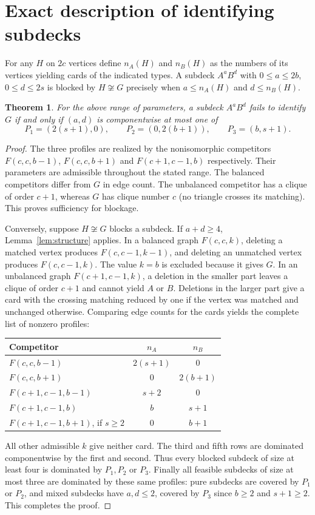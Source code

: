 \documentclass[11pt]{article}
\newtheorem{theorem}{Theorem}
\begin{document}
\section{Exact description of identifying subdecks}
For any $H$ on $2c$ vertices define $n_A(H)$ and $n_B(H)$ as the numbers of its vertices yielding cards of the indicated types. A subdeck $A^aB^d$ with $0\leq a\leq2b$, $0\leq d\leq2s$ is blocked by $H\not\cong G$ precisely when $a\leq n_A(H)$ and $d\leq n_B(H)$.
\begin{theorem}\label{thm:profiles}
For the above range of parameters, a subdeck $A^aB^d$ fails to identify $G$ if and only if $(a,d)$ is componentwise at most one of
\[
 P_1=(2(s+1),0),\qquad P_2=(0,2(b+1)),\qquad P_3=(b,s+1).
\]
\end{theorem}
\begin{proof}
The three profiles are realized by the nonisomorphic competitors $F(c,c,b-1)$, $F(c,c,b+1)$ and $F(c+1,c-1,b)$ respectively. Their parameters are admissible throughout the stated range. The balanced competitors differ from $G$ in edge count. The unbalanced competitor has a clique of order $c+1$, whereas $G$ has clique number $c$ (no triangle crosses its matching). This proves sufficiency for blockage.

Conversely, suppose $H\not\cong G$ blocks a subdeck. If $a+d\geq4$, Lemma~\ref{lem:structure} applies. In a balanced graph $F(c,c,k)$, deleting a matched vertex produces $F(c,c-1,k-1)$, and deleting an unmatched vertex produces $F(c,c-1,k)$. The value $k=b$ is excluded because it gives $G$. In an unbalanced graph $F(c+1,c-1,k)$, a deletion in the smaller part leaves a clique of order $c+1$ and cannot yield $A$ or $B$. Deletions in the larger part give a card with the crossing matching reduced by one if the vertex was matched and unchanged otherwise. Comparing edge counts for the cards yields the complete list of nonzero profiles:
\begin{center}
\begin{tabular}{lcc}
\toprule
Competitor & $n_A$ & $n_B$\\
\midrule
$F(c,c,b-1)$ & $2(s+1)$ & $0$\\
$F(c,c,b+1)$ & $0$ & $2(b+1)$\\
$F(c+1,c-1,b-1)$ & $s+2$ & $0$\\
$F(c+1,c-1,b)$ & $b$ & $s+1$\\
$F(c+1,c-1,b+1)$, if $s\geq2$ & $0$ & $b+1$\\
\bottomrule
\end{tabular}
\end{center}
All other admissible $k$ give neither card. The third and fifth rows are dominated componentwise by the first and second. Thus every blocked subdeck of size at least four is dominated by $P_1,P_2$ or $P_3$. Finally all feasible subdecks of size at most three are dominated by these same profiles: pure subdecks are covered by $P_1$ or $P_2$, and mixed subdecks have $a,d\leq2$, covered by $P_3$ since $b\geq2$ and $s+1\geq2$. This completes the proof.
\end{proof}
\end{document}
